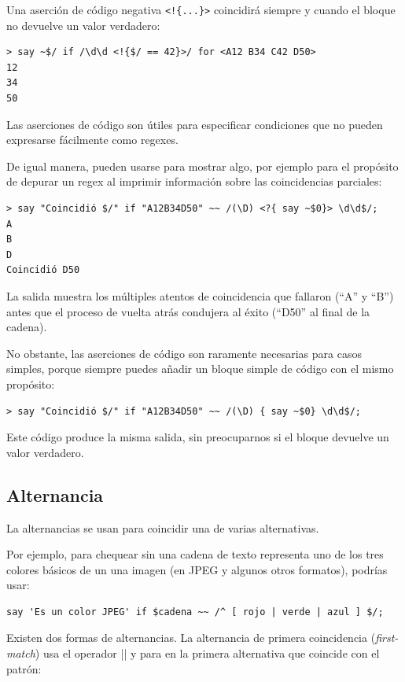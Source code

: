 Una aserción de código negativa \verb|<!{...}>| 
coincidirá siempre y cuando el bloque no devuelve
un valor verdadero:
\begin{verbatim}
> say ~$/ if /\d\d <!{$/ == 42}>/ for <A12 B34 C42 D50>
12
34
50
\end{verbatim}

Las aserciones de código son útiles para especificar 
condiciones que no pueden expresarse fácilmente como
regexes.

De igual manera, pueden usarse para mostrar algo, por ejemplo
para el propósito de depurar un regex al imprimir información
sobre las coincidencias parciales:

\begin{verbatim}
> say "Coincidió $/" if "A12B34D50" ~~ /(\D) <?{ say ~$0}> \d\d$/;
A
B
D
Coincidió D50
\end{verbatim}

La salida muestra los múltiples atentos de coincidencia
que fallaron (``A'' y ``B'') antes que el proceso de vuelta atrás 
condujera al éxito (``D50'' al final de la cadena).

No obstante, las aserciones de código son raramente necesarias
para casos simples, porque siempre puedes añadir un bloque simple de
código con el mismo propósito:
%
\begin{verbatim}
> say "Coincidió $/" if "A12B34D50" ~~ /(\D) { say ~$0} \d\d$/;
\end{verbatim}
Este código produce la misma salida, sin preocuparnos si el 
bloque devuelve un valor verdadero.

\subsection{Alternancia}

La alternancias se usan para coincidir una de varias alternativas.

Por ejemplo, para chequear sin una cadena de texto representa uno 
de los tres colores básicos de un una imagen (en JPEG y algunos otros
formatos), podrías usar:

\begin{verbatim}
say 'Es un color JPEG' if $cadena ~~ /^ [ rojo | verde | azul ] $/;
\end{verbatim}
%

Existen dos formas de alternancias. La alternancia de primera
coincidencia (\emph{first-match}) usa el operador \verb|||| y para en la primera
alternativa que coincide con el patrón:

